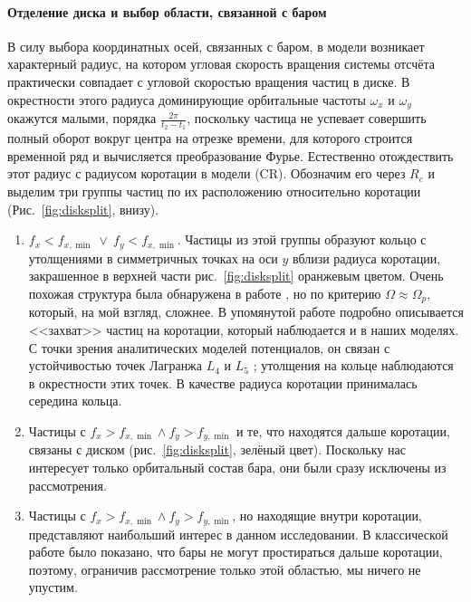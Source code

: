 \documentclass[tikz]{trlnotes}
\begin{document}
\paragraph{Отделение диска и выбор области, связанной с баром}

В силу выбора координатных осей, связанных с баром, в модели возникает характерный радиус, на котором угловая скорость вращения системы отсчёта практически совпадает с угловой скоростью вращения частиц в диске.
В окрестности этого радиуса доминирующие орбитальные частоты $\omega_x$ и $\omega_y$ окажутся малыми, порядка $\frac{2\pi}{t_2 - t_1}$, поскольку частица не успевает совершить полный оборот вокруг центра на отрезке времени, для которого строится временной ряд и вычисляется преобразование Фурье. Естественно отождествить этот радиус с радиусом
коротации в модели (CR). Обозначим его через $R_c$ и выделим три группы частиц по их расположению относительно коротации
(Рис.~\ref{fig:disksplit}, внизу).
\begin{enumerate}
  \item $f_x < f_{x, \min} \:\lor\: f_y < f_{x, \min}$.
Частицы из этой группы образуют кольцо с утолщениями в
симметричных точках на оси $y$ вблизи радиуса коротации, закрашенное в верхней части рис.~\ref{fig:disksplit}
оранжевым цветом.
Очень похожая структура была обнаружена в работе \citet{ceverino2007}, но по критерию $Ω \approx Ω_p$, который, на мой взгляд, сложнее. В упомянутой работе подробно описывается <<захват>> частиц на коротации, который
наблюдается и в наших моделях. С точки зрения аналитических моделей потенциалов, он связан с устойчивостью
точек Лагранжа $L_4$ и $L_5$ \citep[Fig.~3.14]{2008gady.book.....B}; утолщения на кольце наблюдаются в окрестности этих точек.
В качестве радиуса коротации принималась середина кольца.  
\item Частицы с $f_x > f_{x, \min} \land f_y > f_{y, \min}$ и те, что находятся дальше коротации, связаны с диском
(рис.~\ref{fig:disksplit}, зелёный цвет). Поскольку нас интересует только орбитальный состав бара, они были сразу исключены из рассмотрения. 
\item Частицы с $f_x > f_{x, \min} \land f_y > f_{y, \min}$, но находящие внутри коротации, представляют наибольший интерес в данном исследовании. В классической работе \citet{contopoulos1980} было показано, что
бары не могут простираться дальше коротации, поэтому, ограничив рассмотрение только этой областью, мы ничего не
упустим.
\end{enumerate}
\end{document}
